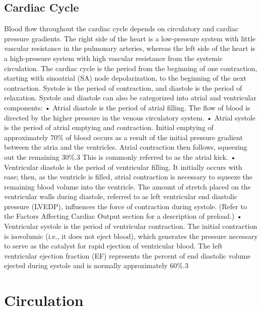\subsection{Cardiac Cycle}
Blood flow throughout the cardiac cycle depends on circulatory and cardiac pressure gradients. The right side of the heart is a low-pressure system with little vascular resistance in the pulmonary arteries, whereas the left side of the heart is a high-pressure system with high vascular resistance from the systemic circulation. The cardiac cycle is the period from the beginning of one contraction, starting with sinoatrial (SA) node depolarization, to the beginning of the next contraction. Systole is the period of contraction, and diastole is the period of relaxation. Systole and diastole can also be categorized into atrial and ventricular components:
•	Atrial diastole is the period of atrial filling. The flow of blood is directed by the higher pressure in the venous circulatory system.
•	Atrial systole is the period of atrial emptying and contraction. Initial emptying of approximately 70\% of blood occurs as a result of the initial pressure gradient between the atria and the ventricles. Atrial contraction then follows, squeezing out the remaining 30\%.3 This is commonly referred to as the atrial kick.
•	Ventricular diastole is the period of ventricular filling. It initially occurs with ease; then, as the ventricle is filled, atrial contraction is necessary to squeeze the remaining blood volume into the ventricle. The amount of stretch placed on the ventricular walls during diastole, referred to as left ventricular end diastolic pressure (LVEDP), influences the force of contraction during systole. (Refer to the Factors Affecting Cardiac Output section for a description of preload.)
•	Ventricular systole is the period of ventricular contraction. The initial contraction is isovolumic (i.e., it does not eject blood), which generates the pressure necessary to serve as the catalyst for rapid ejection of ventricular blood. The left ventricular ejection fraction (EF) represents the percent of end diastolic volume ejected during systole and is normally approximately 60\%.3


\section{Circulation}

